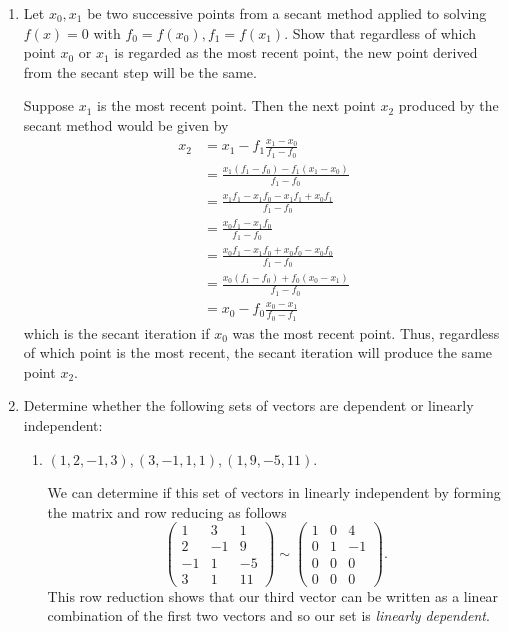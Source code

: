 \documentclass[a4paper,12pt]{article}
\begin{document}
\begin{enumerate}[label = \arabic*.]
	\item Let $ x_0, x_1 $ be two successive points from a secant method applied to solving $ f(x) = 0 $ with $ f_0 = f(x_0), f_1 = f(x_1) $. Show that regardless of which point $ x_0 $ or $ x_1 $ is regarded as the most recent point, the new point derived from the secant step will be the same.
	
	Suppose $ x_1 $ is the most recent point. Then the next point $ x_2 $ produced by the secant method would be given by
	\begin{align*}
		x_2 &= x_1 - f_1 \frac{x_1 - x_0}{f_1 - f_0} \\
		&= \frac{x_1(f_1 - f_0) - f_1(x_1 - x_0)}{f_1 - f_0} \\
		&= \frac{x_1 f_1 - x_1 f_0 - x_1 f_1 + x_0 f_1}{f_1 - f_ 0} \\
		&= \frac{x_0 f_1 - x_1 f_0}{f_1 - f_0} \\
		&= \frac{x_0 f_1 - x_1 f_0 + x_0 f_0 - x_0 f_0}{f_1 - f_0} \\
		&= \frac{x_0 (f_1 - f_0) + f_0(x_0 - x_1) }{f_1 - f_0} \\
		&= x_0 - f_0 \frac{x_0 - x_1}{f_0 - f_1}
	\end{align*}
	which is the secant iteration if $ x_0 $ was the most recent point. Thus, regardless of which point is the most recent, the secant iteration will produce the same point $ x_2 $.
	
	\item Determine whether the following sets of vectors are dependent or linearly independent:
	\begin{enumerate}[label = (\alph*)]
		\item $ (1,2,-1,3), (3,-1,1,1), (1,9,-5,11) $.
		
		We can determine if this set of vectors in linearly independent by forming the matrix and row reducing as follows
		\[
			\begin{pmatrix}
				 1 &  3 &  1 \\
				 2 & -1 &  9 \\
				-1 &  1 & -5 \\
				 3 &  1 & 11
			\end{pmatrix}
			\sim
			\begin{pmatrix}
				1 & 0 & 4 \\
				0 & 1 & -1 \\
				0 & 0 & 0 \\
				0 & 0 & 0
			\end{pmatrix}.
		\]
		This row reduction shows that our third vector can be written as a linear combination of the first two vectors and so our set is \emph{linearly dependent}.
		

\end{enumerate}
\end{enumerate}
\end{document}
